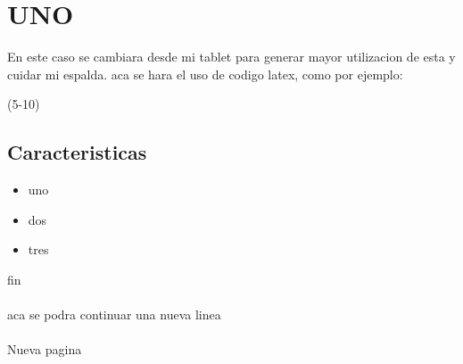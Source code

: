 \section{UNO}
   En este caso se cambiara desde mi tablet para generar mayor utilizacion de esta y cuidar mi espalda.
			aca se hara el uso de codigo latex, como por ejemplo:

\lipsum(5-10)

\subsection{Caracteristicas}
\begin{itemize}
\item uno
\item dos
\item tres
\end{itemize}
fin\\
\\
aca se podra continuar una nueva linea\\
\\
\newpage
Nueva pagina

